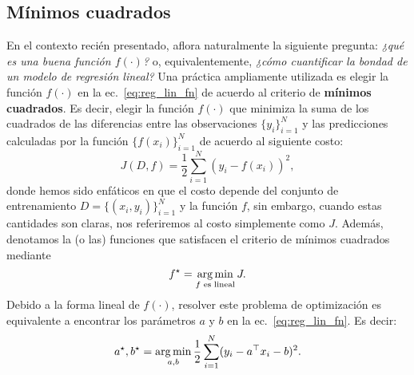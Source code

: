 \subsection{Mínimos cuadrados} %
\label{ssub:min_cuad}
En el contexto recién presentado, aflora naturalmente la siguiente pregunta: \emph{¿qué es una buena función $f(\cdot)$?} o, equivalentemente, \emph{¿cómo cuantificar la bondad de un modelo de regresión lineal?} Una práctica ampliamente utilizada es elegir la función $f(\cdot)$ en la ec.~\eqref{eq:reg_lin_fn} de acuerdo al criterio de \textbf{mínimos cuadrados}. Es decir, elegir la función $f(\cdot)$ que minimiza la suma de los cuadrados de las diferencias entre las observaciones $\{y_i\}_{i=1}^N$ y las predicciones calculadas por la función $\{f(x_i)\}_{i=1}^N$ de acuerdo al siguiente costo:
\begin{equation}
	J(D,f) = \frac{1}{2}\sum_{i=1}^N(y_i-f(x_i))^2,
	\label{eq:least_squares_cost}
\end{equation}
donde hemos sido enfáticos en que el costo depende del conjunto de entrenamiento $D=\{(x_i,y_i)\}_{i=1}^N$ y la función $f$, sin embargo, cuando estas cantidades son claras, nos referiremos al costo simplemente como $J$. Además, denotamos la (o las) funciones que satisfacen el criterio de mínimos cuadrados mediante
\begin{equation}
	f^\star = \operatorname*{arg\,min}_{f\text{ es lineal}} J.
\end{equation}
Debido a la forma lineal de $f(\cdot)$, resolver este problema de optimización es equivalente a encontrar los parámetros $a$ y $b$ en la ec.~\eqref{eq:reg_lin_fn}. Es decir: 
\begin{equation}
	a^\star,b^\star = \operatorname*{arg\,min}_{a,b} \frac{1}{2}\sum_{i=1}^N(y_i-a^
	\top x_i - b)^2.
	\label{eq:lin_least_squares}
\end{equation}

